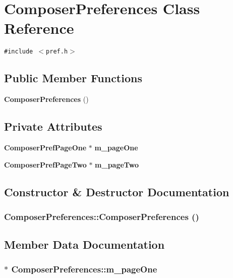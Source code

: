 \section{Composer\-Preferences Class Reference}
\label{classComposerPreferences}
{\tt \#include $<$pref.h$>$}

\subsection*{Public Member Functions}
\begin{CompactItemize}
\item 
{\bf Composer\-Preferences} ()
\end{CompactItemize}
\subsection*{Private Attributes}
\begin{CompactItemize}
\item 
{\bf Composer\-Pref\-Page\-One} $\ast$ {\bf m\_\-page\-One}
\item 
{\bf Composer\-Pref\-Page\-Two} $\ast$ {\bf m\_\-page\-Two}
\end{CompactItemize}


\subsection{Constructor \& Destructor Documentation}
\subsubsection{\setlength{\rightskip}{0pt plus 5cm}Composer\-Preferences::Composer\-Preferences ()}\label{classComposerPreferences_a1190481f99e7f8b6ef20be7b007399f}




\subsection{Member Data Documentation}
\subsubsection{$\ast$ {\bf Composer\-Preferences::m\_\-page\-One}\hspace{0.3cm}{\tt  [private]}}\label{classComposerPreferences_c9bb9ddb693a045dec0166632154deca}


